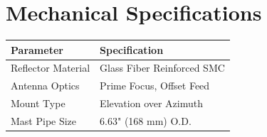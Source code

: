 \documentclass[a4paper,11pt]{article}
\begin{document}
\section*{Mechanical Specifications}
\begin{table}[h!]
    \centering
    \begin{tabular}{@{}ll@{}}
        \toprule
        \textbf{Parameter} & \textbf{Specification} \\
        \midrule
        Reflector Material & Glass Fiber Reinforced SMC \\
        Antenna Optics & Prime Focus, Offset Feed \\
        Mount Type & Elevation over Azimuth \\
        Mast Pipe Size & 6.63" (168 mm) O.D. \\
        \bottomrule
    \end{tabular}
\end{table}
\end{document}
